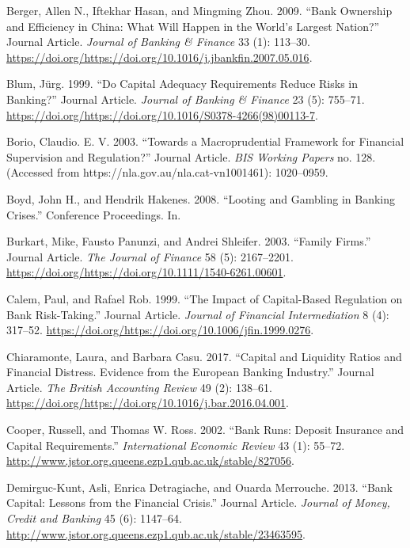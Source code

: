 \documentclass{article}
\begin{document}
\leavevmode\hypertarget{ref-RN26}{}%
Berger, Allen N., Iftekhar Hasan, and Mingming Zhou. 2009. ``Bank
Ownership and Efficiency in China: What Will Happen in the World's
Largest Nation?'' Journal Article. \emph{Journal of Banking \& Finance}
33 (1): 113--30.
\url{https://doi.org/https://doi.org/10.1016/j.jbankfin.2007.05.016}.

\leavevmode\hypertarget{ref-RN29}{}%
Blum, Jürg. 1999. ``Do Capital Adequacy Requirements Reduce Risks in
Banking?'' Journal Article. \emph{Journal of Banking \& Finance} 23 (5):
755--71.
\url{https://doi.org/https://doi.org/10.1016/S0378-4266(98)00113-7}.

\leavevmode\hypertarget{ref-RN30}{}%
Borio, Claudio. E. V. 2003. ``Towards a Macroprudential Framework for
Financial Supervision and Regulation?'' Journal Article. \emph{BIS
Working Papers} no. 128. (Accessed from
https://nla.gov.au/nla.cat-vn1001461): 1020--0959.

\leavevmode\hypertarget{ref-RN31}{}%
Boyd, John H., and Hendrik Hakenes. 2008. ``Looting and Gambling in
Banking Crises.'' Conference Proceedings. In.

\leavevmode\hypertarget{ref-RN33}{}%
Burkart, Mike, Fausto Panunzi, and Andrei Shleifer. 2003. ``Family
Firms.'' Journal Article. \emph{The Journal of Finance} 58 (5):
2167--2201.
\url{https://doi.org/https://doi.org/10.1111/1540-6261.00601}.

\leavevmode\hypertarget{ref-RN35}{}%
Calem, Paul, and Rafael Rob. 1999. ``The Impact of Capital-Based
Regulation on Bank Risk-Taking.'' Journal Article. \emph{Journal of
Financial Intermediation} 8 (4): 317--52.
\url{https://doi.org/https://doi.org/10.1006/jfin.1999.0276}.

\leavevmode\hypertarget{ref-RN36}{}%
Chiaramonte, Laura, and Barbara Casu. 2017. ``Capital and Liquidity
Ratios and Financial Distress. Evidence from the European Banking
Industry.'' Journal Article. \emph{The British Accounting Review} 49
(2): 138--61.
\url{https://doi.org/https://doi.org/10.1016/j.bar.2016.04.001}.

\leavevmode\hypertarget{ref-RN37}{}%
Cooper, Russell, and Thomas W. Ross. 2002. ``Bank Runs: Deposit
Insurance and Capital Requirements.'' \emph{International Economic
Review} 43 (1): 55--72.
\url{http://www.jstor.org.queens.ezp1.qub.ac.uk/stable/827056}.

\leavevmode\hypertarget{ref-RN42}{}%
Demirguc-Kunt, Asli, Enrica Detragiache, and Ouarda Merrouche. 2013.
``Bank Capital: Lessons from the Financial Crisis.'' Journal Article.
\emph{Journal of Money, Credit and Banking} 45 (6): 1147--64.
\url{http://www.jstor.org.queens.ezp1.qub.ac.uk/stable/23463595}.
\end{document}
